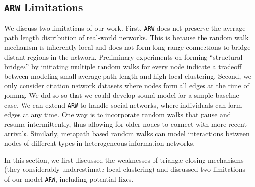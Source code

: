 \subsection{\texttt{ARW} Limitations}
We discuss two limitations of our work. First, \texttt{ARW} does not preserve the average
path length distribution of real-world networks. This is because the random walk
mechanism is inherently local and does not form long-range connections to bridge
distant regions in the network. Preliminary experiments on forming ``structural bridges''
by initiating multiple random walks for every node indicate a tradeoff
between modeling small average path length and high local clustering. Second,
we only consider citation network datasets where nodes form all edges at the time of joining. We did so so that we could develop sound model for a simple baseline case. We can extend \texttt{ARW} to handle social networks, where individuals can form edges at any time. One way is to incorporate random walks that pause and resume intermittently, thus allowing for older nodes to connect with more recent arrivals.
Similarly, metapath based random walks can model interactions between
nodes of different types in heterogeneous information networks.

In this section, we first discussed the weaknesses of triangle closing mechanisms (they considerably underestimate local clustering) and discussed two limitations of our model \texttt{ARW}, including potential fixes.
%

